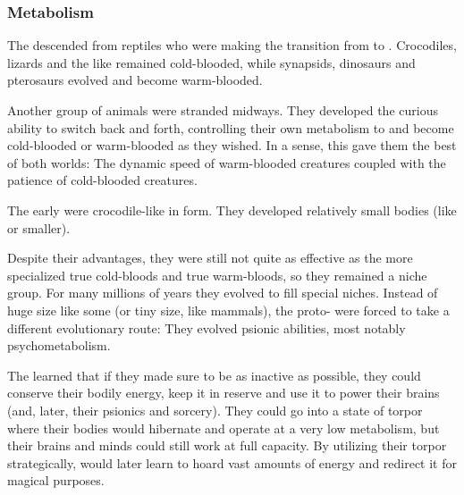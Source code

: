 \subsubsection{Metabolism}
The \ophidians{} descended from reptiles who were making the transition from  to . 
Crocodiles, lizards and the like remained cold-blooded, while synapsids, dinosaurs and pterosaurs evolved and become warm-blooded. 

Another group of animals were stranded midways. 
They developed the curious ability to switch back and forth, controlling their own metabolism to  and become cold-blooded or warm-blooded as they wished. 
In a sense, this gave them the best of both worlds: 
The dynamic speed of warm-blooded creatures coupled with the patience of cold-blooded creatures. 


The early \ophidians{} were crocodile-like in form. 
They developed relatively small bodies (like \humans or smaller). 

Despite their advantages, they were still not quite as effective as the more specialized true cold-bloods and true warm-bloods, so they remained a niche group. 
For many millions of years they evolved to fill special niches. 
Instead of huge size like some \saurians{} (or tiny size, like mammals), the proto-\ophidians{} were forced to take a different evolutionary route: 
They evolved psionic abilities, most notably psychometabolism. 

The \ophidians{} learned that if they made sure to be as inactive as possible, they could conserve their bodily energy, keep it in reserve and use it to power their brains (and, later, their psionics and sorcery). 
They could go into a state of torpor where their bodies would hibernate and operate at a very low metabolism, but their brains and minds could still work at full capacity. 
By utilizing their torpor strategically,  would later learn to hoard vast amounts of energy and redirect it for magical purposes. 






